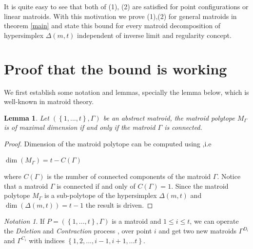 \documentclass[12pt, reqno]{amsart}
\newtheorem{lemma}[theorem]{Lemma}
\theoremstyle{definition}
\theoremstyle{remark}
\numberwithin{equation}{section}
\newtheorem{notation}{Notation}[section]
\begin{document}
  
  
  
  It is quite easy to see that both of (1), (2) are satisfied for point configurations or linear matroids. 
  With this motivation we prove (1),(2) for general matroids in theorem \ref{main} and state this bound for every matroid decomposition of hypersimplex
  $\Delta(m,t)$
  independent of inverse limit  and regularity concept. 
  
  
  
  
  
  \section{Proof that the bound is working }
  We first  establish some notation and lemmas, specially the lemma below, which is well-known in matroid theory.
  \begin{lemma}\label{connecteddim}
  	Let
  	$(\left\{1,...,t\right\},\varGamma)$
  	be an abstract matroid,
  	the matroid polytope
  	$M_{\Gamma}$
  	is of maximal dimension if and only if the matroid $\Gamma$ is connected.
  \end{lemma}
  
  
  \begin{proof}
  	Dimension of the matroid polytope can be computed using \cite[Proposition 2.4]{DMP},i.e
  	\begin{center}
  		$\dim(M_{\Gamma})=t-C(\Gamma)$
  	\end{center}
  	where
  	$C(\Gamma)$
  	is the number of connected components
  	of the matroid
  	$\Gamma$. Notice that a matroid  $\Gamma$ is connected if and only  of $C(\Gamma)=1$. Since the matroid polytope $M_{\Gamma}$ is a sub-polytope of the hypersimplex $\Delta(m,t)$ and $\dim(\Delta(m,t))=t-1$ the result is driven.
  \end{proof}
  
  
  \begin{notation}
  		If 
  		$P=(\left\{1,...,t\right\},\varGamma)$ is a matroid and $1\leq i\leq t$, we can operate the 
  	 \emph{Deletion} and \emph{Contraction} process , over point $i$ and get two new matroids
  	  $\Gamma^{D_i}$ and $\Gamma^{C_i}$
  	  with indices
  	  $\left\{1,2,..., i-1,i+1,...t\right\}$. 
  	 
  \end{notation}
  
\end{document}
